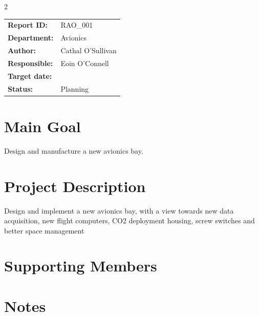 \documentclass[11pt,a4paper]{article}
\begin{document}
\begin{multicols}{2}

\small
\renewcommand{\arraystretch}{1.1}

\begin{tabular}{
    @{}
    >{\bfseries}p{2.3cm}
    p{\dimexpr\columnwidth-2.3cm\relax}
    @{}
}
Report ID: &
RAO\_001 \\

Department: &
Avionics \\

Author: &
Cathal O'Sullivan \\

Responsible: &
Eoin O'Connell \\

Target date: &
 \\

Status: &
Planning \\
\end{tabular}

\normalsize
\vspace{0.4em}

\section*{Main Goal}
Design and manufacture a new avionics bay.

\section*{Project Description}
Design and implement a new avionics bay, with a view towards new data acquisition, new flight computers, CO2 deployment housing, screw switches and better space management

\section*{Supporting Members}


\section*{Notes}


\end{multicols}



\end{document}
